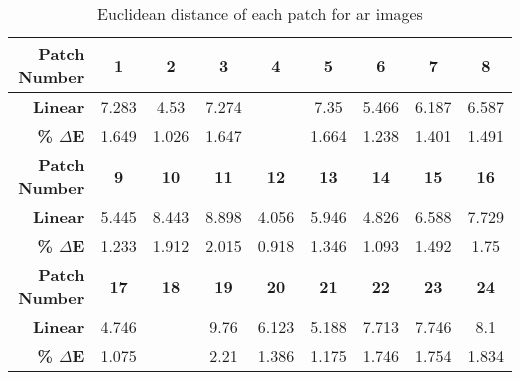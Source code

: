 \begin{table}[H]
  \caption{Euclidean distance of each patch for ar images }
  \begin{center}
    \begin{tabularx}{\textwidth}{r c c c c c c c c}
    \toprule
        \textbf{Patch Number} & \textbf{1} & \textbf{2} & \textbf{3} & \textbf{4} & \textbf{5} & \textbf{6} & \textbf{7} & \textbf{8}\\ \midrule 
        \textbf{Linear} &7.283 &4.53 &7.274 &\cellcolor{colorred}{12.56} &7.35 &5.466 &6.187 &6.587\\ 
        \textbf{\textbf{\% $\Delta$E}} &1.649 &1.026 &1.647 &\cellcolor{colorred}{2.844} &1.664 &1.238 &1.401 &1.491\\ \midrule 
        \textbf{Patch Number} & \textbf{9} & \textbf{10} & \textbf{11} & \textbf{12} & \textbf{13} & \textbf{14} & \textbf{15} & \textbf{16}\\ \midrule 
        \textbf{Linear} &5.445 &8.443 &8.898 &4.056 &5.946 &4.826 &6.588 &7.729\\ 
        \textbf{\textbf{\% $\Delta$E}} &1.233 &1.912 &2.015 &0.918 &1.346 &1.093 &1.492 &1.75\\ \midrule 
        \textbf{Patch Number} & \textbf{17} & \textbf{18} & \textbf{19} & \textbf{20} & \textbf{21} & \textbf{22} & \textbf{23} & \textbf{24}\\ \midrule 
        \textbf{Linear} &4.746 &\cellcolor{colorgreen}{4.019} &9.76 &6.123 &5.188 &7.713 &7.746 &8.1\\ 
        \textbf{\textbf{\% $\Delta$E}} &1.075 &\cellcolor{colorgreen}{0.91} &2.21 &1.386 &1.175 &1.746 &1.754 &1.834\\ \midrule 
    \bottomrule
    \end{tabularx}
  \end{center}
\end{table}

